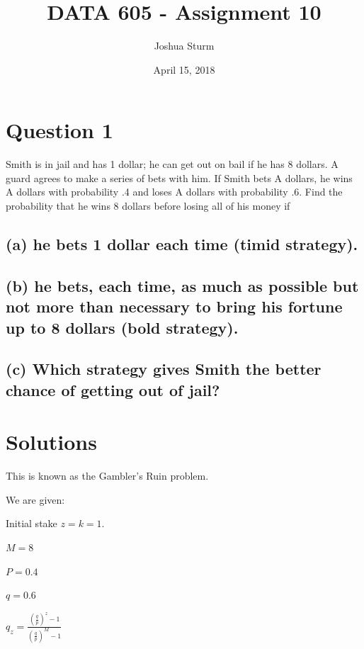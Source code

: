 \documentclass[]{article}
\title{DATA 605 - Assignment 10}
\author{Joshua Sturm}
\date{April 15, 2018}
\begin{document}
\maketitle

\section{Question 1}\label{question-1}

Smith is in jail and has 1 dollar; he can get out on bail if he has 8
dollars. A guard agrees to make a series of bets with him. If Smith bets
A dollars, he wins A dollars with probability .4 and loses A dollars
with probability .6. Find the probability that he wins 8 dollars before
losing all of his money if

\subsection{(a) he bets 1 dollar each time (timid
strategy).}\label{a-he-bets-1-dollar-each-time-timid-strategy.}

\subsection{(b) he bets, each time, as much as possible but not more
than necessary to bring his fortune up to 8 dollars (bold
strategy).}\label{b-he-bets-each-time-as-much-as-possible-but-not-more-than-necessary-to-bring-his-fortune-up-to-8-dollars-bold-strategy.}

\subsection{(c) Which strategy gives Smith the better chance of getting
out of
jail?}\label{c-which-strategy-gives-smith-the-better-chance-of-getting-out-of-jail}

\section{Solutions}\label{solutions}

This is known as the Gambler's Ruin problem.

We are given:

Initial stake \(z = k = 1\).

\(M = 8\)

\(P = 0.4\)

\(q = 0.6\)

\(q_z = \frac{(\frac{q}{p})^z - 1}{(\frac{q}{p})^M - 1}\)
\end{document}
